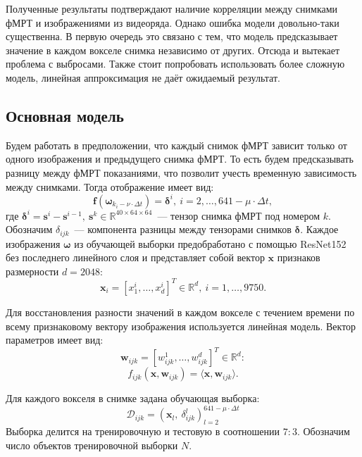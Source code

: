 \documentclass[12pt,twoside]{article}
\begin{document}
Полученные результаты подтверждают наличие корреляции между снимками фМРТ и изображениями из видеоряда. 
Однако ошибка модели довольно-таки существенна.
В первую очередь это связано с тем, что модель предсказывает значение в каждом вокселе снимка независимо от других. 
Отсюда и вытекает проблема с выбросами. 
Также стоит попробовать использовать более сложную модель, линейная аппроксимация не даёт ожидаемый результат.

\subsection{Основная модель}
Будем работать в предположении, что каждый снимок фМРТ зависит только от одного изображения и предыдущего снимка фМРТ. 
То есть будем предсказывать разницу между фМРТ показаниями, что позволит учесть временную зависимость между снимками.
Тогда отображение имеет вид:
\begin{equation}
	\label{main_model}
	\bm{f}(\bm{\omega}_{k_i - \nu \cdot \Delta t}) = \bm{\delta}^i, \ i = 2, \ldots, 641-\mu \cdot \Delta t,
\end{equation}
где $\bm{\delta}^i = \bm{s}^i - \bm{s}^{i-1},~\bm{s}^k \in \mathbb{R}^{40 \times 64 \times 64}$~--- тензор снимка фМРТ под номером $k$.
Обозначим $\delta_{ijk}$~--- компонента разницы между тензорами снимков $\bm{\delta}$.
Каждое изображения $\bm{\omega}$ из обучающей выборки предобработано с помощью ResNet152 без последнего линейного слоя и представляет собой вектор $\bm{x}$ признаков размерности $d=2048$:
\[ \bm{x}_i = [x^i_1, \ldots, x^i_{d}]^{T} \in \mathbb{R}^{d}, \ i = 1, \ldots, 9750. \]

Для восстановления разности значений в каждом вокселе с течением времени по всему признаковому вектору изображения используется линейная модель. Вектор параметров имеет вид:
\[ \bm{w}_{ijk} = [w_{ijk}^1, \ldots, w_{ijk}^{d}]^{T} \in \mathbb{R}^{d}: \]
\begin{equation}
	\label{f_ijk}
	f_{ijk}(\bm{x}, \bm{w}_{ijk}) = \langle \bm{x}, \bm{w}_{ijk} \rangle.
\end{equation}

Для каждого вокселя в снимке задана обучающая выборка:
\begin{equation}
    \mathcal{D}_{ijk} = \left(\bm{x}_l,~\delta^{l}_{ijk} \right)^{641 - \mu \cdot \Delta t}_{l = 2}
\end{equation}
Выборка делится на тренировочную и тестовую в соотношении $7 : 3$. 
Обозначим число объектов тренировочной выборки $N$.
\end{document}
